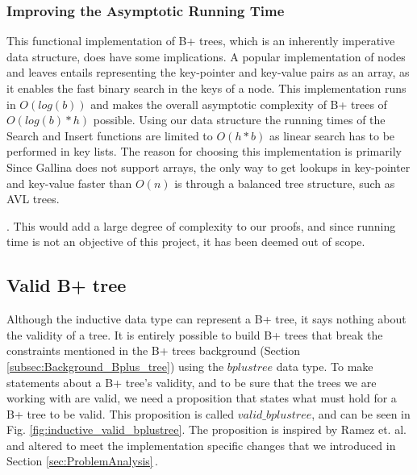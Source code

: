 \subsubsection{Improving the Asymptotic Running Time}
This functional implementation of B+ trees, which is an inherently imperative data structure, does have some implications. A popular implementation of nodes and leaves entails representing the key-pointer and key-value pairs as an array, as it enables the fast binary search in the keys of a node. This implementation runs in $O(log(b))$ and makes the overall asymptotic complexity of B+ trees of $O(log(b)*h)$ possible. Using our data structure the running times of the Search and Insert functions are limited to $O(h*b)$ as linear search has to be performed in key lists. The reason for choosing this implementation is primarily  Since Gallina does not support arrays, the only way to get lookups in key-pointer and key-value faster than $O(n)$ is through a balanced tree structure, such as AVL trees.


. This would add a large degree of complexity to our proofs, and since running time is not an objective of this project, it has been deemed out of scope.

\subsection{Valid B+ tree}
\label{subsec:Valid_bplustree}
Although the inductive data type can represent a B+ tree, it says nothing about the validity of a tree. It is entirely possible to build B+ trees that break the constraints mentioned in the B+ trees background (Section \ref{subsec:Background_Bplus_tree}) using the $bplustree$ data type. To make statements about a B+ tree's validity, and to be sure that the trees we are working with are valid, we need a proposition that states what must hold for a B+ tree to be valid. This proposition is called $valid\_bplustree$, and can be seen in Fig. \ref{fig:inductive_valid_bplustree}. The proposition is inspired by Ramez et. al. and altered to meet the implementation specific changes that we introduced in Section \ref{sec:ProblemAnalysis}\,\cite[pp. 652]{Elmasri1999}.

